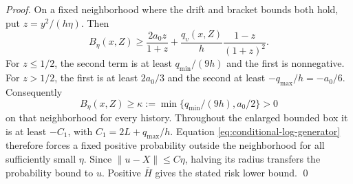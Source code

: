 \begin{proof}
On a fixed neighborhood where the drift and bracket bounds both hold,
put $z=y^2/(h\eta)$. Then
\[
 B_\eta(x,Z)\geq\frac{2a_0z}{1+z}
       +\frac{q_v(x,Z)}h\frac{1-z}{(1+z)^2}.
\]
For $z\leq1/2$, the second term is at least $q_{\min}/(9h)$ and the
first is nonnegative. For $z>1/2$, the first is at least $2a_0/3$ and
the second at least $-q_{\max}/h=-a_0/6$. Consequently
\[
 B_\eta(x,Z)\geq\kappa:=
       \min\{q_{\min}/(9h),a_0/2\}>0
\]
on that neighborhood for every history. Throughout the enlarged bounded
box it is at least
$-C_1$, with $C_1=2L+q_{\max}/h$. Equation
\eqref{eq:conditional-log-generator} therefore forces a fixed positive
probability outside the neighborhood for all sufficiently small $\eta$. Since
$\|u-X\|\leq C\eta$, halving its radius transfers the probability
bound to $u$. Positive $\bar H$ gives the stated risk lower bound.
\qed\end{proof}

